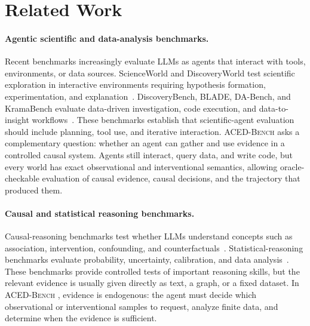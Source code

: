 \documentclass{article}
\newcommand{\bench}{\textsc{ACED-Bench} }
\begin{document}
\section{Related Work}
\label{sec:related}

\paragraph{Agentic scientific and data-analysis benchmarks.}
Recent benchmarks increasingly evaluate LLMs as agents that interact with tools, environments, or data sources.
ScienceWorld and DiscoveryWorld test scientific exploration in interactive environments requiring hypothesis formation, experimentation, and explanation~\citep{wangScienceWorldYourAgent2022a,jansenDiscoveryWorldVirtualEnvironment2024}.
DiscoveryBench, BLADE, DA-Bench, and KramaBench evaluate data-driven investigation, code execution, and data-to-insight workflows~\citep{majumderDiscoveryBenchDataDrivenDiscovery2024,guBLADEBenchmarkingLanguage2024,hu2024infiagentdabench,laiKramaBenchBenchmarkAI2026}.
These benchmarks establish that scientific-agent evaluation should include planning, tool use, and iterative interaction.
\bench{} asks a complementary question: whether an agent can gather and use evidence in a controlled causal system.
Agents still interact, query data, and write code, but every world has exact observational and interventional semantics, allowing oracle-checkable evaluation of causal evidence, causal decisions, and the trajectory that produced them.

\paragraph{Causal and statistical reasoning benchmarks.}
Causal-reasoning benchmarks test whether LLMs understand concepts such as association, intervention, confounding, and counterfactuals~\citep{jinCLadderAssessingCausal2023,wangCausalBenchComprehensiveBenchmark2024,jinCanLargeLanguage2024,duIceCreamDoesnt2026}.
Statistical-reasoning benchmarks evaluate probability, uncertainty, calibration, and data analysis~\citep{liuAreLLMsCapable2024,paruchuriWhatAreOdds2024,nafarReasoningUncertainText2025,zhuAreLargeLanguage2024,rendaOpenEstimateEvaluatingLLMs2026,luStatEvalComprehensiveBenchmark2025}.
These benchmarks provide controlled tests of important reasoning skills, but the relevant evidence is usually given directly as text, a graph, or a fixed dataset.
In \bench, evidence is endogenous: the agent must decide which observational or interventional samples to request, analyze finite data, and determine when the evidence is sufficient.
\end{document}

